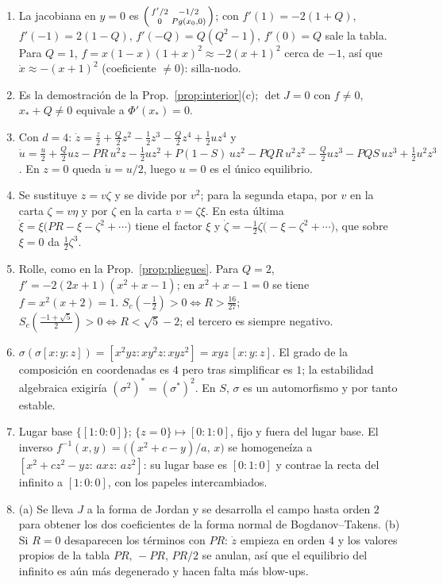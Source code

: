 \documentclass[11pt,a4paper]{article}
\theoremstyle{plain}
\theoremstyle{definition}
\theoremstyle{remark}
\begin{document}
\begin{enumerate}[label=\textbf{Ej.~\arabic*.},leftmargin=*,itemsep=4pt,start=12]
\item La jacobiana en $y=0$ es $\begin{psmallmatrix}f'/2&-1/2\\0&Pg(x_0,0)\end{psmallmatrix}$; con $f'(1)=-2(1+Q)$, $f'(-1)=2(1-Q)$, $f'(-Q)=Q(Q^2-1)$, $f'(0)=Q$ sale la tabla. Para $Q=1$, $f=x(1-x)(1+x)^2\approx-2(x+1)^2$ cerca de $-1$, así que $\dot x\approx-(x+1)^2$ (coeficiente $\ne0$): silla-nodo.
\item Es la demostración de la Prop.~\ref{prop:interior}(c); $\det J=0$ con $f\ne0$, $x_*+Q\ne0$ equivale a $\Phi'(x_*)=0$.
\item Con $d=4$: $\dot z=\tfrac z2+\tfrac Q2z^2-\tfrac12z^3-\tfrac Q2z^4+\tfrac12uz^4$ y $\dot u=\tfrac u2+\tfrac Q2uz-PR\,u^2z-\tfrac12uz^2+P(1-S)\,uz^2-PQR\,u^2z^2-\tfrac Q2uz^3-PQS\,uz^3+\tfrac12u^2z^3$. En $z=0$ queda $\dot u=u/2$, luego $u=0$ es el único equilibrio.
\item Se sustituye $z=v\zeta$ y se divide por $v^2$; para la segunda etapa, por $v$ en la carta $\zeta=v\eta$ y por $\zeta$ en la carta $v=\zeta\xi$. En esta última $\dot\xi=\xi\big(PR-\xi-\zeta^2+\cdots\big)$ tiene el factor $\xi$ y $\dot\zeta=-\tfrac12\zeta\big(-\xi-\zeta^2+\cdots\big)$, que sobre $\xi=0$ da $\tfrac12\zeta^3$.
\item Rolle, como en la Prop.~\ref{prop:pliegues}. Para $Q=2$, $f'=-2(2x+1)(x^2+x-1)$; en $x^2+x-1=0$ se tiene $f=x^2(x+2)=1$. $S_c(-\tfrac12)>0\iff R>\tfrac{16}{27}$; $S_c(\tfrac{-1+\sqrt5}2)>0\iff R<\sqrt5-2$; el tercero es siempre negativo.
\item $\sigma(\sigma[x:y:z])=[x^2yz:xy^2z:xyz^2]=xyz\,[x:y:z]$. El grado de la composición en coordenadas es $4$ pero tras simplificar es $1$; la estabilidad algebraica exigiría $(\sigma^2)^*=(\sigma^*)^2$. En $S$, $\sigma$ es un automorfismo y por tanto estable.
\item Lugar base $\{[1:0:0]\}$; $\{z=0\}\mapsto[0:1:0]$, fijo y fuera del lugar base. El inverso $f^{-1}(x,y)=\big((x^2+c-y)/a,\,x\big)$ se homogeneíza a $[x^2+cz^2-yz:\,axz:\,az^2]$: su lugar base es $[0:1:0]$ y contrae la recta del infinito a $[1:0:0]$, con los papeles intercambiados.
\item (a) Se lleva $J$ a la forma de Jordan y se desarrolla el campo hasta orden $2$ para obtener los dos coeficientes de la forma normal de Bogdanov--Takens. (b) Si $R=0$ desaparecen los términos con $PR$: $\dot z$ empieza en orden $4$ y los valores propios de la tabla $PR,\,-PR,\,PR/2$ se anulan, así que el equilibrio del infinito es aún más degenerado y hacen falta más blow-ups.
\end{enumerate}
\end{document}
